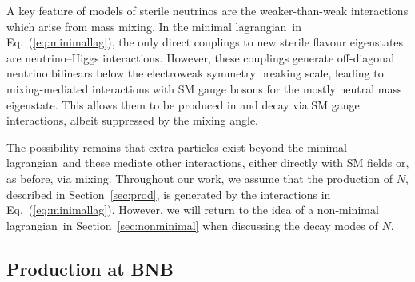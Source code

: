 \documentclass[11pt, a4paper]{article}
\newcommand{\refeq}[1]{Eq.~(\ref{#1})}
\newcommand{\refsec}[1]{Section~\ref{#1}}
\def\lagrangian{lagrangian}
\begin{document}
A key feature of models of sterile neutrinos are the weaker-than-weak
interactions which arise from mass mixing. In the minimal \lagrangian\ in
\refeq{eq:minimallag}, the only direct couplings to new sterile flavour
eigenstates are neutrino--Higgs interactions. However, these couplings generate
off-diagonal neutrino bilinears below the electroweak symmetry breaking scale,
leading to mixing-mediated interactions with SM gauge bosons for the mostly
neutral mass eigenstate. This allows them to be produced in and decay via SM
gauge interactions, albeit suppressed by the mixing angle. 

The possibility remains that extra particles exist beyond the minimal
\lagrangian\ and these mediate other interactions, either directly with SM
fields or, as before, via mixing. 
%
Throughout our work, we assume that the production of $N$, described in
\refsec{sec:prod}, is generated by the interactions in \refeq{eq:minimallag}.
However, we will return to the idea of a non-minimal \lagrangian\ in
\refsec{sec:nonminimal} when discussing the decay modes of $N$.

\subsection{\label{sec:prod}Production at BNB}
\end{document}
